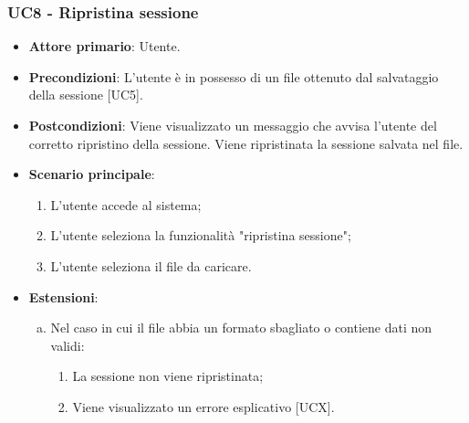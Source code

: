 \subsubsection{UC8 - Ripristina sessione}
\begin{itemize}
	\item \textbf{Attore primario}: Utente.
	\item \textbf{Precondizioni}: L'utente è in possesso di un file  ottenuto dal salvataggio della sessione [UC5].
	\item \textbf{Postcondizioni}: Viene visualizzato un messaggio che avvisa l'utente del corretto ripristino della sessione. Viene ripristinata la sessione salvata nel file.
	\item \textbf{Scenario principale}:
		\begin{enumerate}
			\item L'utente accede al sistema;
			\item L'utente seleziona la funzionalità "ripristina sessione";
			\item L'utente seleziona il file da caricare.
		\end{enumerate}
	\item \textbf{Estensioni}:
	\begin{enumerate}[(a)]
		\item Nel caso in cui il file abbia un formato sbagliato o contiene dati non validi:
		\begin{enumerate}[1.]
			\item La sessione non viene ripristinata;
			\item Viene visualizzato un errore esplicativo [UCX].
		\end{enumerate}
	\end{enumerate}
\end{itemize}